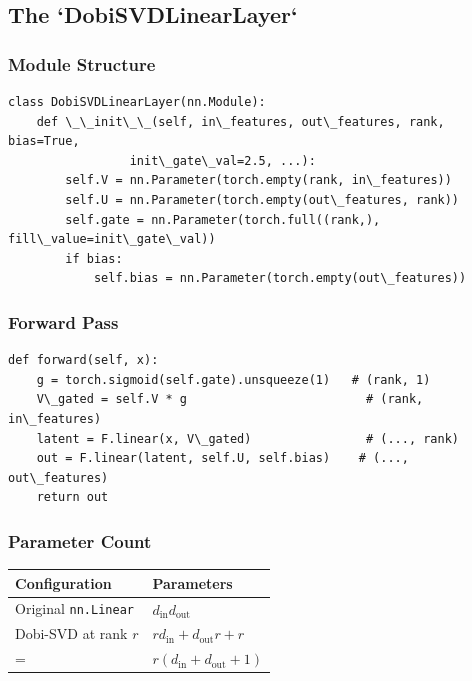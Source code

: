 \subsection{The `DobiSVDLinearLayer`}

\subsubsection{Module Structure}

\begin{lstlisting}
class DobiSVDLinearLayer(nn.Module):
    def \_\_init\_\_(self, in\_features, out\_features, rank, bias=True,
                 init\_gate\_val=2.5, ...):
        self.V = nn.Parameter(torch.empty(rank, in\_features))
        self.U = nn.Parameter(torch.empty(out\_features, rank))
        self.gate = nn.Parameter(torch.full((rank,), fill\_value=init\_gate\_val))
        if bias:
            self.bias = nn.Parameter(torch.empty(out\_features))
\end{lstlisting}

\subsubsection{Forward Pass}

\begin{lstlisting}
def forward(self, x):
    g = torch.sigmoid(self.gate).unsqueeze(1)   # (rank, 1)
    V\_gated = self.V * g                         # (rank, in\_features)
    latent = F.linear(x, V\_gated)                # (..., rank)
    out = F.linear(latent, self.U, self.bias)    # (..., out\_features)
    return out
\end{lstlisting}

\subsubsection{Parameter Count}

\begin{table}[H]
\centering
\small
\begin{tabular}{ll}
\toprule
\textbf{Configuration} & \textbf{Parameters} \\
\midrule
Original \texttt{nn.Linear} & $d_\text{in} d_\text{out}$ \\
Dobi-SVD at rank $r$ & $r d_\text{in} + d_\text{out} r + r$ \\
= & $r(d_\text{in} + d_\text{out} + 1)$ \\
\bottomrule
\end{tabular}
\end{table}

